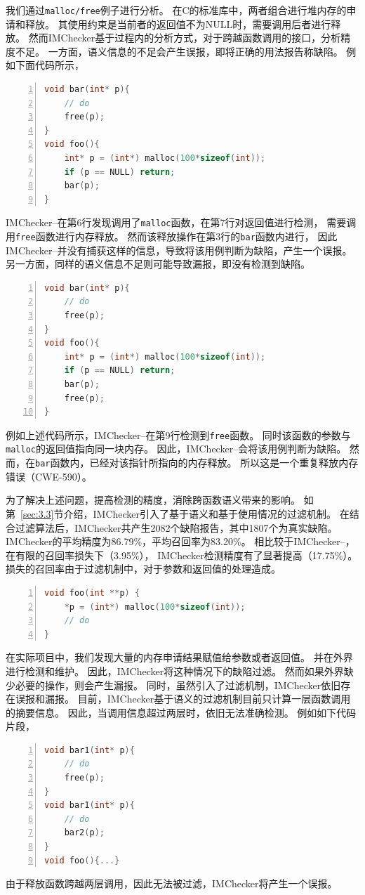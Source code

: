 我们通过\texttt{malloc/free}例子进行分析。
在C的标准库中，两者组合进行堆内存的申请和释放。
其使用约束是当前者的返回值不为NULL时，需要调用后者进行释放。
然而IMChecker基于过程内的分析方式，对于跨越函数调用的接口，分析精度不足。
一方面，语义信息的不足会产生误报，即将正确的用法报告称缺陷。
例如下面代码所示，
\begin{lstlisting}[language={C},
basicstyle=\linespread{0.7}\listingsfont,
numbers=left,
xleftmargin=.2\textwidth]
void bar(int* p){
	// do
	free(p);
}
void foo(){
	int* p = (int*) malloc(100*sizeof(int));
	if (p == NULL) return;
	bar(p);
}
\end{lstlisting}
IMChecker--在第6行发现调用了\texttt{malloc}函数，在第7行对返回值进行检测，
需要调用\texttt{free}函数进行内存释放。
然而该释放操作在第3行的\texttt{bar}函数内进行，
因此IMChecker--并没有捕获这样的信息，导致将该用例判断为缺陷，产生一个误报。
另一方面，同样的语义信息不足则可能导致漏报，即没有检测到缺陷。
\begin{lstlisting}[language={C},
basicstyle=\linespread{0.7}\listingsfont,
numbers=left,
xleftmargin=.2\textwidth]
void bar(int* p){
	// do
	free(p);
}
void foo(){
	int* p = (int*) malloc(100*sizeof(int));
	if (p == NULL) return;
	bar(p);
	free(p);
}
\end{lstlisting}
例如上述代码所示，IMChecker--在第9行检测到\texttt{free}函数。
同时该函数的参数与\texttt{malloc}的返回值指向同一块内存。
因此，IMChecker--会将该用例判断为缺陷。
然而，在\texttt{bar}函数内，已经对该指针所指向的内存释放。
所以这是一个重复释放内存错误（CWE-590）。

为了解决上述问题，提高检测的精度，消除跨函数语义带来的影响。
如第~\ref{sec:3.3}节介绍，IMChecker引入了基于语义和基于使用情况的过滤机制。
在结合过滤算法后，IMChecker共产生2082个缺陷报告，其中1807个为真实缺陷。
IMChecker的平均精度为86.79\%，平均召回率为83.20\%。
相比较于IMChecker--，在有限的召回率损失下（3.95\%），
IMChecker检测精度有了显著提高（17.75\%）。
损失的召回率由于过滤机制中，对于参数和返回值的处理造成。
\begin{lstlisting}[language={C},
basicstyle=\linespread{0.7}\listingsfont,
numbers=left,
xleftmargin=.2\textwidth]
void foo(int **p) {
	*p = (int*) malloc(100*sizeof(int));
	// do
}
\end{lstlisting}
在实际项目中，我们发现大量的内存申请结果赋值给参数或者返回值。
并在外界进行检测和维护。
因此，IMChecker将这种情况下的缺陷过滤。
然而如果外界缺少必要的操作，则会产生漏报。
同时，虽然引入了过滤机制，IMChecker依旧存在误报和漏报。
目前，IMChecker基于语义的过滤机制目前只计算一层函数调用的摘要信息。
因此，当调用信息超过两层时，依旧无法准确检测。
例如如下代码片段，
\begin{lstlisting}[language={C},
basicstyle=\linespread{0.7}\listingsfont,
numbers=left,
xleftmargin=.2\textwidth]
void bar1(int* p){        
	// do						   
	free(p);					  
}
void bar1(int* p){        
	// do						   
	bar2(p);					  
}
void foo(){...}
\end{lstlisting}
由于释放函数跨越两层调用，因此无法被过滤，IMChecker将产生一个误报。


